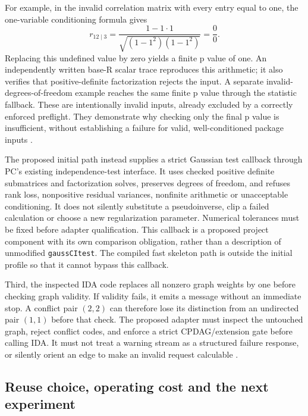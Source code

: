 For example, in the invalid correlation matrix with every entry equal to
one, the one-variable conditioning formula gives \[
 r_{12\mid3}
   =\frac{1-1\cdot1}{\sqrt{(1-1^2)(1-1^2)}}=\frac00.
\] Replacing this undefined value by zero yields a finite p value of
one. An independently written base-R scalar trace reproduces this
arithmetic; it also verifies that positive-definite factorization
rejects the input. A separate invalid-degrees-of-freedom example reaches
the same finite p value through the statistic fallback. These are
intentionally invalid inputs, already excluded by a correctly enforced
preflight. They demonstrate why checking only the final p value is
insufficient, without establishing a failure for valid, well-conditioned
package inputs \citep{exec13_pcalg_reuse_examples}.

The proposed initial path instead supplies a strict Gaussian test
callback through PC's existing independence-test interface. It uses
checked positive definite submatrices and factorization solves,
preserves degrees of freedom, and refuses rank loss, nonpositive
residual variances, nonfinite arithmetic or unacceptable conditioning.
It does not silently substitute a pseudoinverse, clip a failed
calculation or choose a new regularization parameter. Numerical
tolerances must be fixed before adapter qualification. This callback is
a proposed project component with its own comparison obligation, rather
than a description of unmodified \texttt{gaussCItest}. The compiled fast
skeleton path is outside the initial profile so that it cannot bypass
this callback.

Third, the inspected IDA code replaces all nonzero graph weights by one
before checking graph validity. If validity fails, it emits a message
without an immediate stop. A conflict pair \((2,2)\) can therefore lose
its distinction from an undirected pair \((1,1)\) before that check. The
proposed adapter must inspect the untouched graph, reject conflict
codes, and enforce a strict CPDAG/extension gate before calling IDA. It
must not treat a warning stream as a structured failure response, or
silently orient an edge to make an invalid request calculable
\citep{exec13_pcalg_reuse_primary}.

\hypertarget{reuse-choice-operating-cost-and-the-next-experiment}{%
\subsection{Reuse choice, operating cost and the next
experiment}\label{reuse-choice-operating-cost-and-the-next-experiment}}

